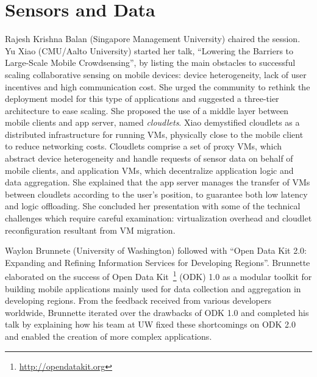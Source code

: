 \section{Sensors and Data}
\label{sec:sensors}

Rajesh Krishna Balan (Singapore Management University) chaired the
session. Yu Xiao (CMU/Aalto University) started her talk, ``Lowering the
Barriers to Large-Scale Mobile Crowdsensing'', by listing the main
obstacles to successful scaling collaborative sensing on mobile devices:
device heterogeneity, lack of user incentives and high communication
cost. She urged the community to rethink the deployment model for this
type of applications and suggested a three-tier architecture to ease
scaling.  She proposed the use of a middle layer between mobile clients
and app server, named \emph{cloudlets}. Xiao demystified cloudlets as a
distributed infrastructure for running VMs, physically close to the
mobile client to reduce networking costs. Cloudlets comprise a set of
proxy VMs, which abstract device heterogeneity and handle requests of
sensor data on behalf of mobile clients, and application VMs, which
decentralize application logic and data aggregation. She explained that
the app server manages the transfer of VMs between cloudlets according
to the user's position, to guarantee both low latency and logic
offloading. She concluded her presentation with some of the technical
challenges which require careful examination: virtualization overhead
and cloudlet reconfiguration resultant from VM migration.

Waylon Brunnete (University of Washington) followed with ``Open Data Kit
2.0: Expanding and Refining Information Services for Developing
Regions''. Brunnette elaborated on the success of Open Data
Kit~\footnote{\url{http://opendatakit.org}} (ODK) 1.0 as a modular
toolkit for building mobile applications mainly used for data collection
and aggregation in developing regions. From the feedback received from
various developers worldwide, Brunnette iterated over the drawbacks of
ODK 1.0 and completed his talk by explaining how his team at UW fixed
these shortcomings on ODK 2.0 and enabled the creation of more complex
applications.


